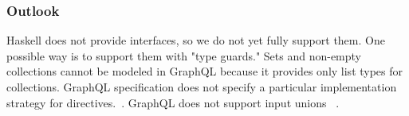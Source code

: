 \begin{frame}\frametitle{Outlook}

\begin{itemize}
      Haskell does not provide interfaces, so we do not yet fully support them. One possible way is to support them with "type guards." 
     Sets and non-empty collections cannot be modeled in GraphQL because it provides only list types for collections.
     GraphQL specification does not specify a particular implementation strategy for directives.~\cite{schema-directives}.
     GraphQL does not support input unions ~\cite{gql-spec-input-unions}.

\end{itemize}

\end{frame}
